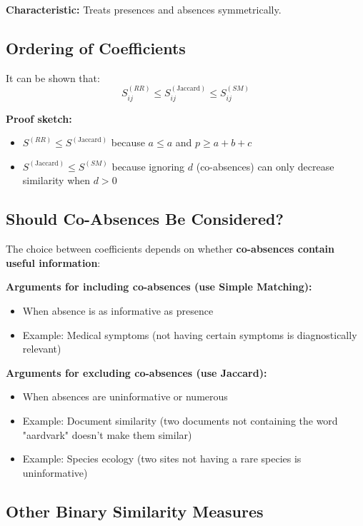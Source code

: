 \documentclass[11pt]{article}
\begin{document}
\textbf{Characteristic:} Treats presences and absences symmetrically.

\subsection{Ordering of Coefficients}

It can be shown that:
$$S_{ij}^{(RR)} \leq S_{ij}^{(\text{Jaccard})} \leq S_{ij}^{(SM)}$$

\textbf{Proof sketch:}
\begin{itemize}
    \item $S^{(RR)} \leq S^{(\text{Jaccard})}$ because $a \leq a$ and $p \geq a + b + c$
    \item $S^{(\text{Jaccard})} \leq S^{(SM)}$ because ignoring $d$ (co-absences) can only decrease similarity when $d > 0$
\end{itemize}

\subsection{Should Co-Absences Be Considered?}

The choice between coefficients depends on whether \textbf{co-absences contain useful information}:

\textbf{Arguments for including co-absences (use Simple Matching):}
\begin{itemize}
    \item When absence is as informative as presence
    \item Example: Medical symptoms (not having certain symptoms is diagnostically relevant)
\end{itemize}

\textbf{Arguments for excluding co-absences (use Jaccard):}
\begin{itemize}
    \item When absences are uninformative or numerous
    \item Example: Document similarity (two documents not containing the word "aardvark" doesn't make them similar)
    \item Example: Species ecology (two sites not having a rare species is uninformative)
\end{itemize}

\subsection{Other Binary Similarity Measures}
\end{document}
